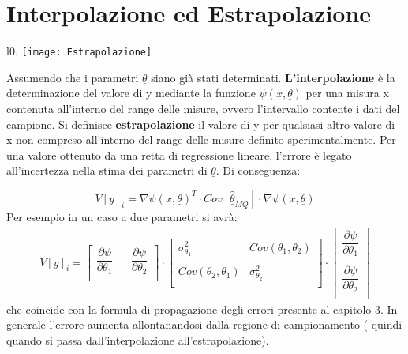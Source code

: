 \documentclass[11pt,a4paper]{book}
\begin{document}
\section{Interpolazione ed Estrapolazione}

\begin{wrapfigure}{l}{0.\textwidth}
\centering
\texttt{[image: Estrapolazione]}	
\end{wrapfigure}
Assumendo che i parametri $\underline{\theta}$ siano gi\`{a} stati determinati. \textbf{L'interpolazione} \`{e} la determinazione del valore di y mediante la funzione $\psi(x,\underline{\theta})$ per una misura x contenuta all'interno del range delle misure, ovvero l'intervallo contente i dati del campione. Si definisce \textbf{estrapolazione} il valore di y per qualsiasi altro valore di x non compreso all'interno del range delle misure definito sperimentalmente. Per una valore ottenuto da una retta di regressione lineare, l'errore \`{e} legato all'incertezza nella stima dei parametri di $\underline{\theta}$. Di conseguenza:

\begin{equation}
	V[y]_{i} = \nabla \psi(x,\underline{\theta})^T \cdot Cov[\underline{\hat{\theta}}_{MQ}] \cdot \nabla \psi(x,\underline{\theta}) 
\end{equation} 
Per esempio in un caso a due parametri si avr\`{a}:
\begin{align*}
V[y]_{i} = 
	\begin{bmatrix}
		\dfrac{\partial \psi}{\partial \theta_{1}} & & \dfrac{\partial \psi}{\partial \theta_{2}}  \\ 
	\end{bmatrix}
	\cdot 
	\begin{bmatrix}
		\sigma_{\theta_{1}}^2 & Cov(\theta_1,\theta_2) \\
		\\ 
		Cov(\theta_2,\theta_1) & \sigma_{\theta_{2}}^2 \\
	\end{bmatrix}
	\cdot 
	\begin{bmatrix}
		\dfrac{\partial \psi}{\partial \theta_{1}} \\
		\\
		\dfrac{\partial \psi}{\partial \theta_{2}} \\
	\end{bmatrix}
\end{align*}
che coincide con la formula di propagazione degli errori presente al capitolo 3. In generale l'errore aumenta allontanandosi dalla regione di campionamento ( quindi quando si passa dall'interpolazione all'estrapolazione).
\end{document}
